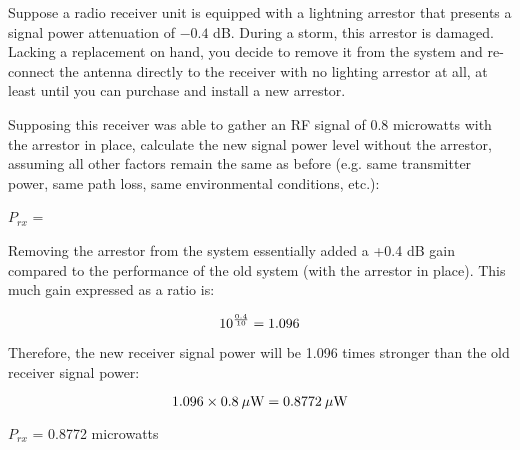 

Suppose a radio receiver unit is equipped with a lightning arrestor that presents a signal power attenuation of $-0.4$ dB.  During a storm, this arrestor is damaged.  Lacking a replacement on hand, you decide to remove it from the system and re-connect the antenna directly to the receiver with no lighting arrestor at all, at least until you can purchase and install a new arrestor.

\vskip 10pt

Supposing this receiver was able to gather an RF signal of 0.8 microwatts with the arrestor in place, calculate the new signal power level without the arrestor, assuming all other factors remain the same as before (e.g. same transmitter power, same path loss, same environmental conditions, etc.):

\vskip 10pt

$P_{rx}$ = 

\vskip 10pt







Removing the arrestor from the system essentially added a +0.4 dB gain compared to the performance of the old system (with the arrestor in place).  This much gain expressed as a ratio is:

$$10^{0.4 \over 10} = 1.096$$

Therefore, the new receiver signal power will be 1.096 times stronger than the old receiver signal power:

$$1.096 \times 0.8 \> \mu\hbox{W} = 0.8772 \> \mu\hbox{W}$$

$P_{rx}$ = 0.8772 microwatts











